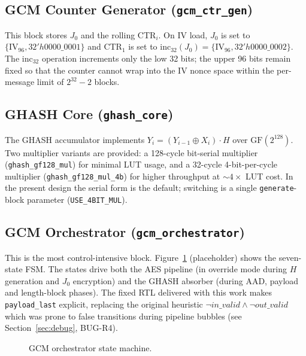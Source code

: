 \documentclass[conference,10pt,a4paper]{IEEEtran}
\begin{document}
\subsection{GCM Counter Generator (\texttt{gcm\_ctr\_gen})}
This block stores $J_0$ and the rolling CTR$_i$.  On IV load, $J_0$ is
set to $\{\mathrm{IV}_{96}, 32'h0000\_0001\}$ and CTR$_1$ is set to
$\mathrm{inc}_{32}(J_0) = \{\mathrm{IV}_{96}, 32'h0000\_0002\}$.  The
inc$_{32}$ operation increments only the low 32 bits; the upper 96 bits
remain fixed so that the counter cannot wrap into the IV nonce space
within the per-message limit of $2^{32}-2$ blocks.

\subsection{GHASH Core (\texttt{ghash\_core})}
The GHASH accumulator implements
$Y_i = (Y_{i-1} \oplus X_i) \cdot H$ over $\mathrm{GF}(2^{128})$.
Two multiplier variants are provided: a 128-cycle bit-serial multiplier
(\texttt{ghash\_gf128\_mul}) for minimal LUT usage, and a 32-cycle
4-bit-per-cycle multiplier (\texttt{ghash\_gf128\_mul\_4b}) for higher
throughput at $\sim 4\times$ LUT cost.  In the present design the serial
form is the default; switching is a single \texttt{generate}-block
parameter (\texttt{USE\_4BIT\_MUL}).

\subsection{GCM Orchestrator (\texttt{gcm\_orchestrator})}
This is the most control-intensive block.  Figure~\ref{fig:gcm-fsm}
(placeholder) shows the seven-state FSM.  The states drive both the AES
pipeline (in override mode during $H$ generation and $J_0$ encryption)
and the GHASH absorber (during AAD, payload and length-block phases).
The fixed RTL delivered with this work makes \texttt{payload\_last}
explicit, replacing the original heuristic
$\lnot\textit{in\_valid} \land \lnot \textit{out\_valid}$
which was prone to false transitions during pipeline bubbles
(see Section~\ref{sec:debug}, BUG-R4).

\begin{figure}[t]
  \centering
  \caption{GCM orchestrator state machine.}
  \label{fig:gcm-fsm}
\end{figure}
\end{document}
